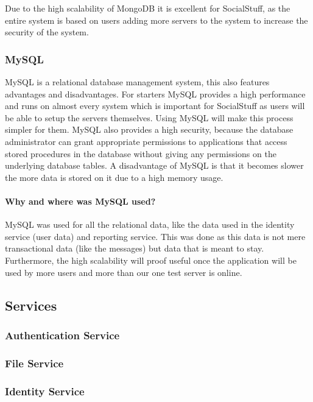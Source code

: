 Due to the high scalability of MongoDB it is excellent for SocialStuff, as the entire system is based on users adding
more servers to the system to increase the security of the system.

\subsubsection{MySQL}
MySQL is a relational database management system, this also features advantages and disadvantages.
For starters MySQL provides a high performance and runs on almost every system which is important for SocialStuff as
users will be able to setup the servers themselves.
Using MySQL will make this process simpler for them.
MySQL also provides a high security, because the database administrator can grant appropriate permissions to
applications that access stored procedures in the database without giving any permissions on the underlying database
tables.
A disadvantage of MySQL is that it becomes slower the more data is stored on it due to a high memory usage.

\paragraph{Why and where was MySQL used?}
MySQL was used for all the relational data, like the data used in the identity service (user data) and reporting
service.
This was done as this data is not mere transactional data (like the messages) but data that is meant to stay.
Furthermore, the high scalability will proof useful once the application will be used by more users and more than our
one test server is online.

\subsection{Services}\label{subsec:services2}

\subsubsection{Authentication Service}

\subsubsection{File Service}

\subsubsection{Identity Service}
\label{subsubsec:identitySer}

